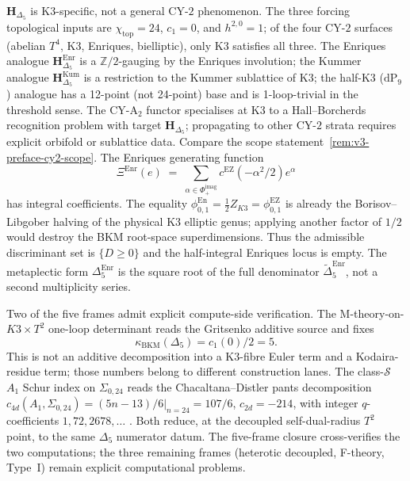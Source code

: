 \begin{remark}
\label{rem:v3-intro-cy2-scope}
\label{rem:v3-preface-cy2-scope}
$\mathbf{H}_{\Delta_5}$ is K3-specific, not a general CY-$2$ phenomenon.
The three forcing topological inputs are $\chi_{\mathrm{top}} = 24$,
$c_1 = 0$, and $h^{2,0} = 1$; of the four CY-$2$ surfaces
(abelian $T^4$, K3, Enriques, bielliptic), only K3 satisfies all three.
The Enriques analogue $\mathbf{H}_{\Delta_5}^{\mathrm{Enr}}$ is a
$\mathbb{Z}/2$-gauging by the Enriques involution; the Kummer analogue
$\mathbf{H}_{\Delta_5}^{\mathrm{Kum}}$ is a restriction to the Kummer
sublattice of K3; the half-K3 ($\mathrm{dP}_9$) analogue has a
12-point (not 24-point) base and is 1-loop-trivial in the threshold
sense. The CY-A$_2$ functor specialises at K3 to a Hall--Borcherds
recognition problem with target $\mathbf{H}_{\Delta_5}$; propagating to
other CY-$2$ strata requires explicit orbifold or sublattice data.
Compare the scope statement~\ref{rem:v3-preface-cy2-scope}.
The Enriques generating function
\[
 \Xi^{\mathrm{Enr}}(e)
 \;=\;
 \sum_{\alpha\in\Phi_+^{\mathrm{imag}}}
 c^{\mathrm{EZ}}\!\left(-\alpha^2/2\right)e^\alpha
\]
has integral coefficients. The equality
\(\phi^{\mathrm{En}}_{0,1}=\frac12 Z_{K3}=\phi^{\mathrm{EZ}}_{0,1}\)
is already the Borisov--Libgober halving of the physical K3 elliptic
genus; applying another factor of \(1/2\) would destroy the BKM
root-space superdimensions. Thus the admissible discriminant set is
\(\{D\geq0\}\) and the half-integral Enriques locus is empty. The
metaplectic form \(\Delta_5^{\mathrm{Enr}}\) is the square root of the
full denominator
\(\widetilde\Delta_5^{\mathrm{Enr}}\), not a second multiplicity
series.
\end{remark}

\begin{remark}
\label{rem:v3-intro-compute-closure}
Two of the five frames admit explicit compute-side verification. The
M-theory-on-$K3\times T^2$ one-loop determinant reads the Gritsenko
additive source and fixes
\[
 \kappa_{\mathrm{BKM}}(\Delta_5)=c_1(0)/2=5.
\]
This is not an additive decomposition into a K3-fibre Euler term and a
Kodaira-residue term; those numbers belong to different construction
lanes. The
class-$\mathcal S$ $A_1$ Schur index on $\Sigma_{0,24}$ reads the
Chacaltana--Distler pants decomposition
$c_{4d}(A_1, \Sigma_{0,24}) = (5n - 13)/6|_{n = 24} = 107/6$,
$c_{2d} = -214$, with integer $q$-coefficients $1, 72, 2678, \ldots$
\cite{ChacaltanaDistler2010, BeemPeelaersRastelli2014}. Both reduce,
at the decoupled self-dual-radius $T^2$ point, to the same $\Delta_5$
numerator datum. The five-frame closure cross-verifies the two
computations; the three remaining frames (heterotic decoupled,
F-theory, Type~I) remain explicit computational problems.
\end{remark}

